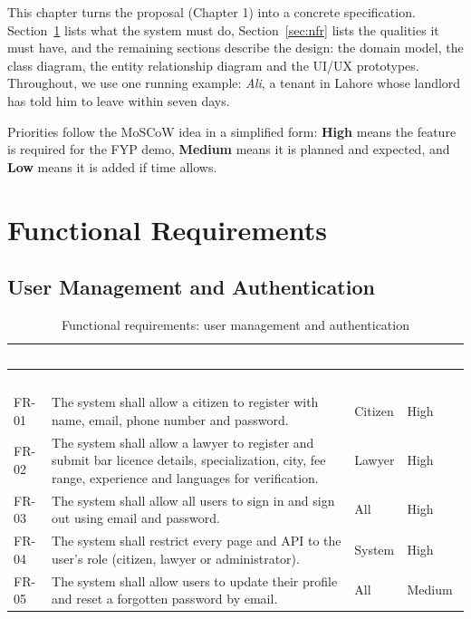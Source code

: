 \documentclass[12pt,a4paper]{report}
\newcommand{\thd}[1]{\textcolor{white}{\textbf{#1}}}
\newcommand{\headrow}{\rowcolor{tablehead}}
\newcommand{\fr}[4]{#1 & #2 & #3 & #4 \\ \hline}
\newcommand{\frhead}{\hline\headrow \thd{ID} & \thd{Requirement} & \thd{Actor} & \thd{Priority} \\ \hline}
\begin{document}
This chapter turns the proposal (Chapter 1) into a concrete specification. Section~\ref{sec:fr} lists what the system must do, Section~\ref{sec:nfr} lists the qualities it must have, and the remaining sections describe the design: the domain model, the class diagram, the entity relationship diagram and the UI/UX prototypes. Throughout, we use one running example: \emph{Ali}, a tenant in Lahore whose landlord has told him to leave within seven days.

Priorities follow the MoSCoW idea in a simplified form: \textbf{High} means the feature is required for the FYP demo, \textbf{Medium} means it is planned and expected, and \textbf{Low} means it is added if time allows.

\section{Functional Requirements}\label{sec:fr}

\subsection{User Management and Authentication}
\begin{longtable}{|p{1.4cm}|L{9.0cm}|L{2.0cm}|L{1.6cm}|}
\caption{Functional requirements: user management and authentication}\label{tab:fr-auth}\\
\frhead\endfirsthead \frhead\endhead
\fr{FR-01}{The system shall allow a citizen to register with name, email, phone number and password.}{Citizen}{High}
\fr{FR-02}{The system shall allow a lawyer to register and submit bar licence details, specialization, city, fee range, experience and languages for verification.}{Lawyer}{High}
\fr{FR-03}{The system shall allow all users to sign in and sign out using email and password.}{All}{High}
\fr{FR-04}{The system shall restrict every page and API to the user's role (citizen, lawyer or administrator).}{System}{High}
\fr{FR-05}{The system shall allow users to update their profile and reset a forgotten password by email.}{All}{Medium}
\end{longtable}
\end{document}

